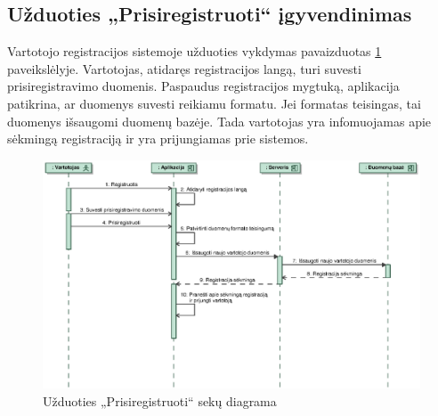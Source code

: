 \documentclass[12pt]{article}
\begin{document}
	\pagebreak
	
	\subsection{Užduoties „Prisiregistruoti“ įgyvendinimas}
	
	Vartotojo registracijos sistemoje užduoties vykdymas pavaizduotas \ref{RegisterSeq} paveikslėlyje. Vartotojas, atidaręs registracijos langą, turi suvesti prisiregistravimo duomenis. Paspaudus registracijos mygtuką, aplikacija patikrina, ar duomenys suvesti reikiamu formatu. Jei formatas teisingas, tai duomenys išsaugomi duomenų bazėje. Tada vartotojas yra infomuojamas apie sėkmingą registraciją ir yra prijungiamas prie sistemos.	
	
	\begin{figure}[h]
		\begin{center}
			\includegraphics[width=\textwidth]{Prisiregistruoti.eps}
			\caption{Užduoties „Prisiregistruoti“ sekų diagrama\label{RegisterSeq}}
		\end{center}
	\end{figure}
	
	\pagebreak
	
\end{document}
